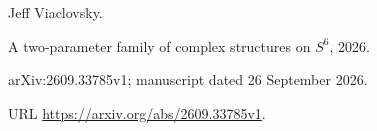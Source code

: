 Jeff Viaclovsky.

\newblock A two-parameter family of complex structures on {$S^6$},
  2026{}.

\newblock arXiv:2609.33785v1; manuscript dated 26 September 2026.

\newblock URL \url{https://arxiv.org/abs/2609.33785v1}.

